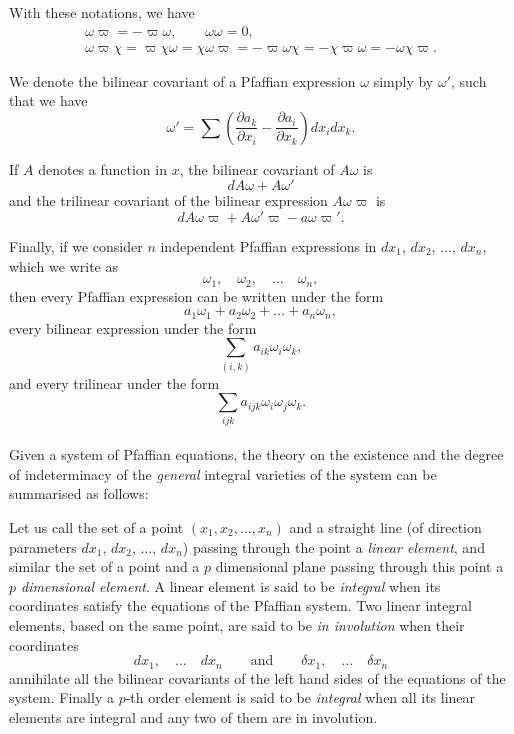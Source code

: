 \documentclass[leqno,11pt]{book}
\newcommand{\pd}{\partial}
\theoremstyle{shape1}
\theoremstyle{shapesmall}
\newcommand{\vp}{\varpi}
\begin{document}
With these notations, we have
\begin{gather*}
  \omega\vp=-\vp\omega,\qquad\omega\omega=0,\\
  \omega\vp\chi=\vp\chi\omega=\chi\omega\vp=-\vp\omega\chi=-\chi\vp\omega=-\omega\chi\vp.
\end{gather*}

We denote the bilinear covariant of a Pfaffian expression $\omega$ simply by $\omega'$, such that we have
\[
\omega'=\sum\left(\frac{\pd a_{k}}{\pd x_{i}}-\frac{\pd a_{i}}{\pd x_{k}}\right)dx_{i}dx_{k}.
\]

If $A$ denotes a function in $x$, the bilinear covariant of $A\omega$ is
\[
dA\omega+A\omega'
\]
and the trilinear covariant of the bilinear expression $A\omega\vp$ is
\begin{equation}
  \label{eq:p7}
  dA\omega\vp+A\omega'\vp-a\omega\vp'.
\end{equation}

Finally, if we consider $n$ independent Pfaffian expressions in $dx_{1}$, $dx_{2}$, $\dots$, $dx_{n}$, which we write as
\[
\omega_{1},\quad\omega_{2},\quad\dots\quad\omega_{n},
\]
then every Pfaffian expression can be written under the form
\[
a_{1}\omega_{1}+a_{2}\omega_{2}+\dots+a_{n}\omega_{n},
\]
every bilinear expression under the form
\[
\sum_{(i,k)}a_{ik}\omega_{i}\omega_{k},
\]
and every trilinear under the form
\[
\sum_{ijk}a_{ijk}\omega_{i}\omega_{j}\omega_{k}.
\]

\paragraph{}
\label{sec:p3}
Given a system of Pfaffian equations, the theory on the existence and the degree of indeterminacy of the \emph{general} integral varieties of the system can be summarised as follows:

Let us call the set of a point $(x_{1}, x_{2}, \dots, x_{n})$ and a straight line (of direction parameters $dx_{1}$, $dx_{2}$, $\dots$, $dx_{n}$) passing through the point a \emph{linear element}, and similar the set of a point and a $p$ dimensional plane passing through this point a \emph{$p$ dimensional element}. A linear element is said to be \emph{integral} when its coordinates satisfy the equations of the Pfaffian system. Two linear integral elements, based on the same point, are said to be \emph{in involution} when their coordinates
\[
dx_{1},\quad\dots\quad dx_{n}\qquad\text{and}\qquad\delta x_{1},\quad\dots\quad\delta x_{n}
\]
annihilate all the bilinear covariants of the left hand sides of the equations of the system. Finally a $p$-th order element is said to be \emph{integral} when all its linear elements are integral and any two of them are in involution.
\end{document}
